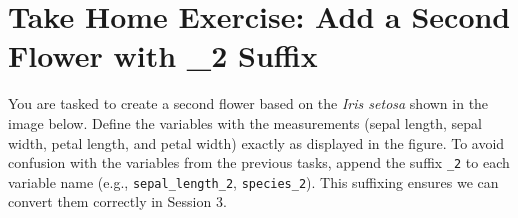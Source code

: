 





\section{Take Home Exercise: Add a Second Flower with \_2 Suffix}

You are tasked to create a second flower based on the \textit{Iris setosa} shown in the image below. 
Define the variables with the measurements (sepal length, sepal width, petal length, and petal width) exactly as displayed in the figure. 
To avoid confusion with the variables from the previous tasks, append the suffix \texttt{\_2} to each variable name (e.g., \texttt{sepal\_length\_2}, \texttt{species\_2}). This suffixing ensures we can convert them correctly in Session 3.

